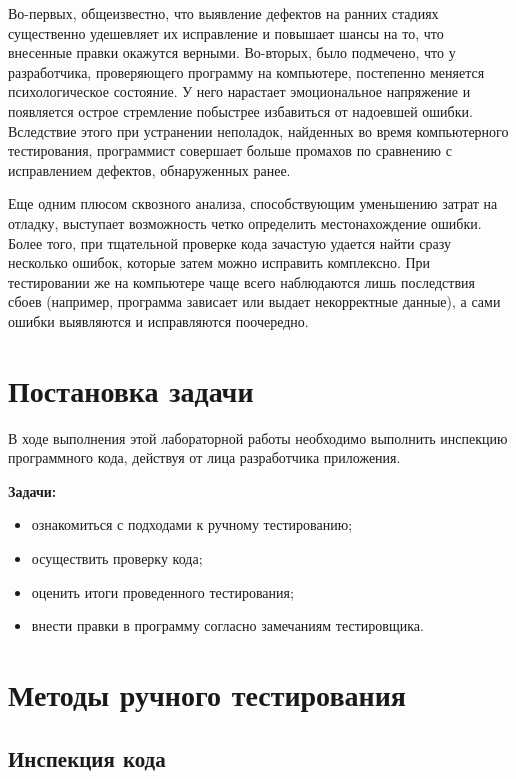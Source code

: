 \documentclass{article}[14pt]
\begin{document}
Во-первых, общеизвестно, что выявление дефектов на ранних стадиях существенно удешевляет их исправление и повышает шансы 
на то, что внесенные правки окажутся верными. Во-вторых, было подмечено, что у разработчика, проверяющего программу на 
компьютере, постепенно меняется психологическое состояние. У него нарастает эмоциональное напряжение и появляется острое 
стремление побыстрее избавиться от надоевшей ошибки. Вследствие этого при устранении неполадок, найденных во время 
компьютерного тестирования, программист совершает больше промахов по сравнению с исправлением дефектов, обнаруженных ранее.

Еще одним плюсом сквозного анализа, способствующим уменьшению затрат на отладку, выступает возможность четко определить 
местонахождение ошибки. Более того, при тщательной проверке кода зачастую удается найти сразу несколько ошибок, которые 
затем можно исправить комплексно. При тестировании же на компьютере чаще всего наблюдаются лишь последствия сбоев 
(например, программа зависает или выдает некорректные данные), а сами ошибки выявляются и исправляются поочередно.

\pagebreak

\section{Постановка задачи}

В ходе выполнения этой лабораторной работы необходимо выполнить инспекцию программного кода, 
действуя от лица разработчика приложения.

\noindent \textbf{Задачи:}

\begin{itemize}
    \item ознакомиться с подходами к ручному тестированию;
    \item осуществить проверку кода;
    \item оценить итоги проведенного тестирования;
    \item внести правки в программу согласно замечаниям тестировщика.
\end{itemize}

\pagebreak

\section{Методы ручного тестирования}

\subsection{Инспекция кода}
\end{document}
